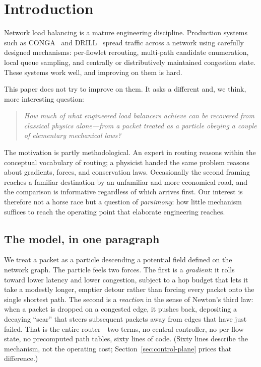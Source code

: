\section{Introduction}
\label{sec:intro}

Network load balancing is a mature engineering discipline. Production systems
such as CONGA~\cite{conga} and DRILL~\cite{drill} spread traffic across a
network using carefully designed mechanisms: per-flowlet rerouting, multi-path
candidate enumeration, local queue sampling, and centrally or distributively
maintained congestion state. These systems work well, and improving on them is
hard.

This paper does not try to improve on them. It asks a different and, we think,
more interesting question:

\begin{quote}
\emph{How much of what engineered load balancers achieve can be recovered from
classical physics alone---from a packet treated as a particle obeying a couple
of elementary mechanical laws?}
\end{quote}

The motivation is partly methodological. An expert in routing reasons within
the conceptual vocabulary of routing; a physicist handed the same problem
reasons about gradients, forces, and conservation laws. Occasionally the second
framing reaches a familiar destination by an unfamiliar and more economical
road, and the comparison is informative regardless of which arrives first. Our
interest is therefore not a horse race but a question of \emph{parsimony}: how
little mechanism suffices to reach the operating point that elaborate
engineering reaches.

\subsection{The model, in one paragraph}

We treat a packet as a particle descending a potential field defined on the
network graph. The particle feels two forces. The first is a \emph{gradient}:
it rolls toward lower latency and lower congestion, subject to a hop budget that
lets it take a modestly longer, emptier detour rather than forcing every packet
onto the single shortest path. The second is a \emph{reaction} in the sense of
Newton's third law: when a packet is dropped on a congested edge, it pushes
back, depositing a decaying ``scar'' that steers subsequent packets away from
edges that have just failed. That is the entire router---two terms, no central
controller, no per-flow state, no precomputed path tables, sixty lines of code. (Sixty lines describe the mechanism, not the operating cost; Section~\ref{sec:control-plane} prices that difference.)

